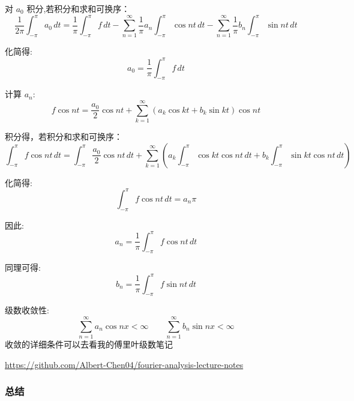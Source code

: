 \documentclass[12pt,a4paper]{article}
\numberwithin{subsection}{section}
\numberwithin{subsubsection}{subsection}
\theoremstyle{plain}
\theoremstyle{definition}
\theoremstyle{remark}
\begin{document}
	对 \( a_0 \) 积分,若积分和求和可换序：
	\begin{equation}
		\frac{1}{2\pi} \int_{-\pi}^{\pi} a_0 \, dt = \frac{1}{\pi} \int_{-\pi}^{\pi} f \, dt - \sum_{n=1}^{\infty} \frac{1}{\pi} a_n \int_{-\pi}^{\pi} \cos nt \, dt - \sum_{n=1}^{\infty} \frac{1}{\pi} b_n \int_{-\pi}^{\pi} \sin nt \, dt
	\end{equation}
	
	化简得:
	\begin{equation}
		a_0 = \frac{1}{\pi} \int_{-\pi}^{\pi} f \, dt
	\end{equation}
	
	计算 \( a_n \):
	\begin{equation}
		f \cos nt = \frac{a_0}{2} \cos nt + \sum_{k=1}^{\infty} \left( a_k \cos kt + b_k \sin kt \right) \cos nt
	\end{equation}
	
	积分得，若积分和求和可换序：
	\begin{equation}
		\int_{-\pi}^{\pi} f \cos nt \, dt = \int_{-\pi}^{\pi} \frac{a_0}{2} \cos nt \, dt + \sum_{k=1}^{\infty} \left( a_k \int_{-\pi}^{\pi} \cos kt \cos nt \, dt + b_k \int_{-\pi}^{\pi} \sin kt \cos nt \, dt \right)
	\end{equation}
	
	化简得:
	\begin{equation}
		\int_{-\pi}^{\pi} f \cos nt \, dt = a_n \pi
	\end{equation}
	
	因此:
	\begin{equation}
		a_n = \frac{1}{\pi} \int_{-\pi}^{\pi} f \cos nt \, dt
	\end{equation}
	
	同理可得:
	\begin{equation}
		b_n = \frac{1}{\pi} \int_{-\pi}^{\pi} f \sin nt \, dt
	\end{equation}
	
	级数收敛性:
	\begin{equation}
		\sum_{n=1}^{\infty} a_n \cos nx < \infty \qquad \sum_{n=1}^{\infty} b_n \sin nx < \infty
	\end{equation}
	收敛的详细条件可以去看我的傅里叶级数笔记
	
	\url{https://github.com/Albert-Chen04/fourier-analysis-lecture-notes}
	
	\subsubsection{总结}
	
\end{document}
